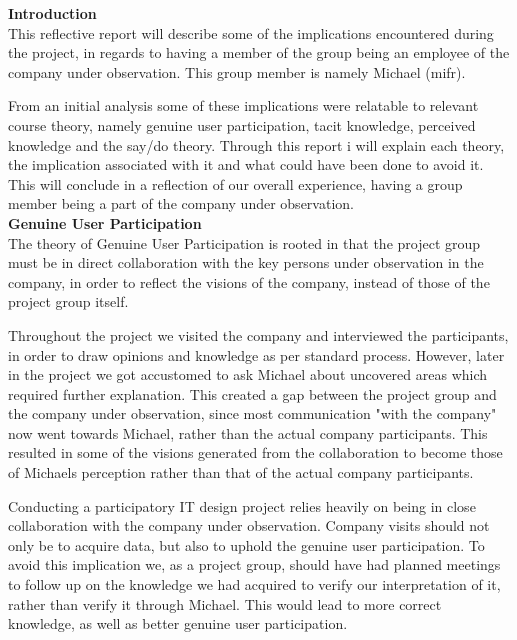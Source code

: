 \textbf{Introduction}\\

This reflective report will describe some of the implications encountered during the project, in regards to having a member of the group being an employee of the company under observation. This group member is namely Michael (mifr).


From an initial analysis some of these implications were relatable to relevant course theory, namely genuine user participation, tacit knowledge, perceived knowledge and the say/do theory.
Through this report i will explain each theory, the implication associated with it and what could have been done to avoid it.
This will conclude in a reflection of our overall experience, having a group member being a part of the company under observation.
\\

\textbf{Genuine User Participation}\\

The theory of Genuine User Participation is rooted in that the project group must be in direct collaboration with the key persons under observation in the company, in order to reflect the visions of the company, instead of those of the project group itself.

Throughout the project we visited the company and interviewed the participants, in order to draw opinions and knowledge as per standard process. However, later in the project we got accustomed to ask Michael about uncovered areas which required further explanation. This created a gap between the project group and the company under observation, since most communication "with the company" now went towards Michael, rather than the actual company participants. This resulted in some of the visions generated from the collaboration to become those of Michaels perception rather than that of the actual company participants.

Conducting a participatory IT design project relies heavily on being in close collaboration with the company under observation. Company visits should not only be to acquire data, but also to uphold the genuine user participation. To avoid this implication we, as a project group, should have had planned meetings to follow up on the knowledge we had acquired to verify our interpretation of it, rather than verify it through Michael. This would lead to more correct knowledge, as well as better genuine user participation.
\\

